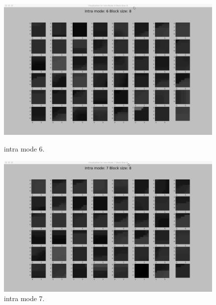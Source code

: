 \begin{figure}[H]
    \begin{minipage}{0.49\textwidth}
        \includegraphics[width=\linewidth]{Figures/visu-size8x8/8-6}
        \caption[Intra mode 6]{intra mode 6.}
        \label{fig:size8_mode6}
    \end{minipage}
    \hspace{\fill} %
    \begin{minipage}{0.49\textwidth}
        \includegraphics[width=\linewidth]{Figures/visu-size8x8/8-7}
        \caption[Intra mode 7]{intra mode 7.}
        \label{fig:size8_mode7}
    \end{minipage}
    
    \vspace*{1cm} %


\end{figure}
